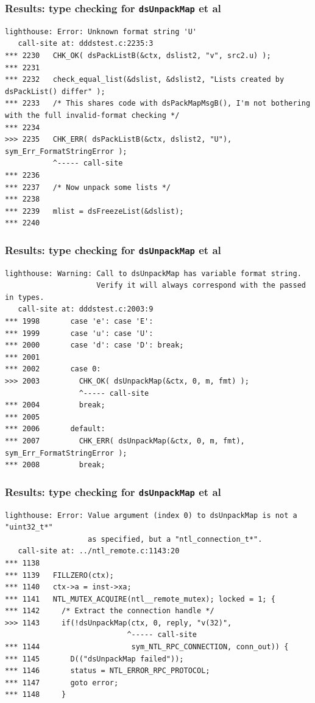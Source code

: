 \documentclass{beamer}
\begin{document}
\begin{frame}[fragile]
  \frametitle{Results: type checking for \texttt{dsUnpackMap} et al}
\tiny \begin{verbatim}
lighthouse: Error: Unknown format string 'U'
   call-site at: dddstest.c:2235:3
*** 2230   CHK_OK( dsPackListB(&ctx, dslist2, "v", src2.u) );
*** 2231 
*** 2232   check_equal_list(&dslist, &dslist2, "Lists created by dsPackList() differ" );
*** 2233   /* This shares code with dsPackMapMsgB(), I'm not bothering with the full invalid-format checking */
*** 2234 
>>> 2235   CHK_ERR( dsPackListB(&ctx, dslist2, "U"), sym_Err_FormatStringError );
           ^----- call-site
*** 2236 
*** 2237   /* Now unpack some lists */
*** 2238 
*** 2239   mlist = dsFreezeList(&dslist);
*** 2240 
\end{verbatim}
\end{frame}

\begin{frame}[fragile]
  \frametitle{Results: type checking for \texttt{dsUnpackMap} et al}
\tiny \begin{verbatim}
lighthouse: Warning: Call to dsUnpackMap has variable format string.
                     Verify it will always correspond with the passed in types.
   call-site at: dddstest.c:2003:9
*** 1998       case 'e': case 'E':
*** 1999       case 'u': case 'U':
*** 2000       case 'd': case 'D': break;
*** 2001 
*** 2002       case 0:
>>> 2003         CHK_OK( dsUnpackMap(&ctx, 0, m, fmt) );
                 ^----- call-site
*** 2004         break;
*** 2005 
*** 2006       default:
*** 2007         CHK_ERR( dsUnpackMap(&ctx, 0, m, fmt), sym_Err_FormatStringError );
*** 2008         break;
\end{verbatim}
\end{frame}

\begin{frame}[fragile]
  \frametitle{Results: type checking for \texttt{dsUnpackMap} et al}
\tiny \begin{verbatim}
lighthouse: Error: Value argument (index 0) to dsUnpackMap is not a "uint32_t*"
                   as specified, but a "ntl_connection_t*".
   call-site at: ../ntl_remote.c:1143:20
*** 1138 
*** 1139   FILLZERO(ctx);
*** 1140   ctx->a = inst->xa;
*** 1141   NTL_MUTEX_ACQUIRE(ntl__remote_mutex); locked = 1; {
*** 1142     /* Extract the connection handle */
>>> 1143     if(!dsUnpackMap(ctx, 0, reply, "v(32)",
                            ^----- call-site
*** 1144                     sym_NTL_RPC_CONNECTION, conn_out)) {
*** 1145       D(("dsUnpackMap failed"));
*** 1146       status = NTL_ERROR_RPC_PROTOCOL;
*** 1147       goto error;
*** 1148     }
\end{verbatim}
\end{frame}
\end{document}
